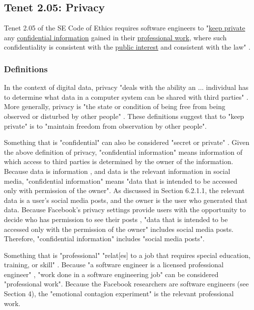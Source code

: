 \subsection{Tenet 2.05: Privacy}
Tenet 2.05 of the SE Code of Ethics requires software engineers to "\uline{keep private} any \uline{confidential information} gained in their \uline{professional work}, where such confidentiality is consistent with the \uline{public interest} and consistent with the law" \cite{code}.

\subsubsection{Definitions}
In the context of digital data, privacy "deals with the ability an ... individual has to determine what data in a computer system can be shared with third parties" \cite{define-information-privacy}.  More generally, privacy is "the state or condition of being free from being observed or disturbed by other people" \cite{define-privacy}.  These definitions suggest that to "keep private" is to "maintain freedom from observation by other people".

Something that is "confidential" can also be considered "secret or private" \cite{define-confidential}.  Given the above definition of privacy, "confidential information" means information of which access to third parties is determined by the owner of the information.  Because data is information \cite{define-data}, and data is the relevant information in social media, "confidential information" means "data that is intended to be accessed only with permission of the owner".  As discussed in Section 6.2.1.1, the relevant data is a user's social media posts, and the owner is the user who generated that data.  Because Facebook's privacy settings provide users with the opportunity to decide who has permission to see their posts \cite{privacy-settings}, "data that is intended to be accessed only with the permission of the owner" includes social media posts.  Therefore, "confidential information" includes "social media posts".

Something that is "professional" "relat[es] to a job that requires special education, training, or skill" \cite{define-professional}.  Because "a software engineer is a licensed professional engineer" \cite{define-software-engineer}, "work done in a software engineering job" can be considered "professional work".  Because the Facebook researchers are software engineers (see Section 4), the "emotional contagion experiment" is the relevant professional work.

